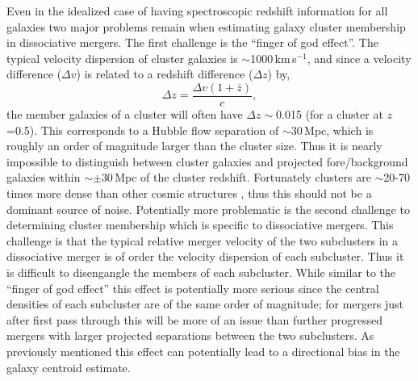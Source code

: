 Even in the idealized case of having spectroscopic redshift information for all galaxies two major problems remain when estimating galaxy cluster membership in dissociative mergers.
The first challenge is the ``finger of god effect''.
The typical velocity dispersion of cluster galaxies is $\sim$1000\,km\,s$^{-1}$, and since a velocity difference ($\Delta v$) is related to a redshift difference ($\Delta z$) by,
\begin{displaymath}
\Delta z = \frac{\Delta v (1+\bar{z})}{c},
\end{displaymath}
the member galaxies of a cluster will often have $\Delta z\sim$0.015 (for a cluster at $z$=0.5).
This corresponds to a Hubble flow separation of $\sim$30\,Mpc, which is roughly an order of magnitude larger than the cluster size.
Thus it is nearly impossible to distinguish between cluster galaxies and projected fore/background galaxies within $\sim\pm$30\,Mpc of the cluster redshift.
Fortunately clusters are $\sim$20-70 times more dense than other cosmic structures \citep[e.g. filaments, walls and voids;][]{AragonCalvo:2010cq}, thus this should not be a dominant source of noise.
Potentially more problematic is the second challenge to determining cluster membership which is specific to dissociative mergers.
This challenge is that the typical relative merger velocity of the two subclusters in a dissociative merger is of order the velocity dispersion of each subcluster.
Thus it is difficult to disengangle the members of each subcluster.
While similar to the ``finger of god effect'' this effect is potentially more serious since the central densities of each subcluster are of the same order of magnitude; for mergers just after first pass through this will be more of an issue than further progressed mergers with larger projected separations between the two subclusters.
As previously mentioned this effect can potentially lead to a directional bias in the galaxy centroid estimate.
 

